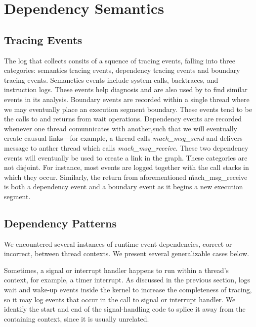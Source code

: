 \section{Dependency Semantics}
\label{sec:dependency-semantics}
\subsection{Tracing Events}
The log that \xxx collects consits of a squence of tracing events, falling into three categories:
semantics tracing events, dependency tracing events and boundary tracing events.
Semanctics events include system calls, backtraces, and instruction logs.  These events help diagnosis and are also used by \xxx to find similar events in its analysis.
Boundary events are recorded within a single thread where we may eventually place an execution segment boundary.  These events tend to be the calls to and returns from wait operations.
Dependency events are recorded whenever one thread comunnicates with another,such that we will eventually create causual links---for example, a thread calls \textit{mach\_msg\_send} and delivers message to anther thread which calls \textit{mach\_msg\_receive}. These two dependency events will eventually be used to create a link in the graph.  These categories are not disjoint.  For instance, most events are logged together with the call stacks in which they occur.  Similarly, the return from aforementioned \v{mach\_msg\_receive} is both a dependency event and a boundary event as it begins a new execution segment.

\subsection{Dependency Patterns}
\label{sec:patterns}

We encountered several instances of runtime event dependencies, correct or incorrect, between thread
contexts. We present several generalizable cases below.

Sometimes, a signal or interrupt handler happens to run within a thread's context, for
example, a timer interrupt.  As discussed in the previous section, \xxx logs wait and wake-up events inside the kernel to increase the completeness of tracing, so it may log events that occur in the call to signal or interrupt handler.  We identify the start and end of the
signal-handling code to splice it away from the containing context, since it is
usually unrelated.


